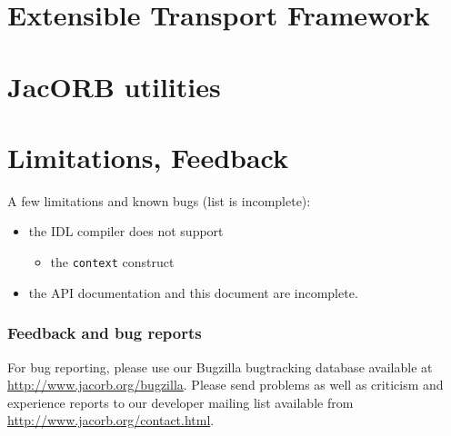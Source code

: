 \documentclass[12pt]{scrbook}
\begin{document}



\chapter{Extensible Transport Framework}
\label{ch:etf}




\chapter{JacORB utilities}
\label{ch:tools}





\chapter{Limitations, Feedback}

A few limitations and known bugs (list is incomplete):

\begin{itemize}
    \item the IDL compiler does not support
    \begin{itemize}
        \item the {\tt context} construct
    \end{itemize}
    \item the API documentation and this document are incomplete.
\end{itemize}

\subsection*{Feedback and bug reports}

For bug reporting, please use our Bugzilla bugtracking database available at
\href{http://www.jacorb.org/bugzilla}{http://www.jacorb.org/bugzilla}.  Please
send problems as well as criticism and experience reports to our developer
mailing list available from
\href{http://www.jacorb.org/contact.html}{http://www.jacorb.org/contact.html}.

{


}
\end{document}
